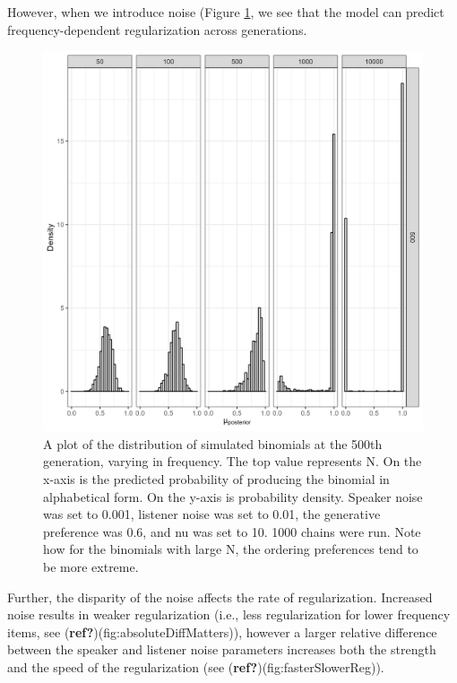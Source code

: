 \documentclass[
  jou,floatsintext]{apa6}
\begin{document}
However, when we introduce noise (Figure \ref{fig:regularizationplot1}, we see that the model can predict frequency-dependent regularization across generations.



\begin{figure}

{\centering \includegraphics[width=1\linewidth]{Figures/speaker_noise_001_listener_01} 

}

\caption{A plot of the distribution of simulated binomials at the 500th generation, varying in frequency. The top value represents N. On the x-axis is the predicted probability of producing the binomial in alphabetical form. On the y-axis is probability density. Speaker noise was set to 0.001, listener noise was set to 0.01, the generative preference was 0.6, and nu was set to 10. 1000 chains were run. Note how for the binomials with large N, the ordering preferences tend to be more extreme.}\label{fig:regularizationplot1}
\end{figure}

Further, the disparity of the noise affects the rate of regularization. Increased noise results in weaker regularization (i.e., less regularization for lower frequency items, see (\textbf{ref?})(fig:absoluteDiffMatters)), however a larger relative difference between the speaker and listener noise parameters increases both the strength and the speed of the regularization (see (\textbf{ref?})(fig:fasterSlowerReg)).
\end{document}
